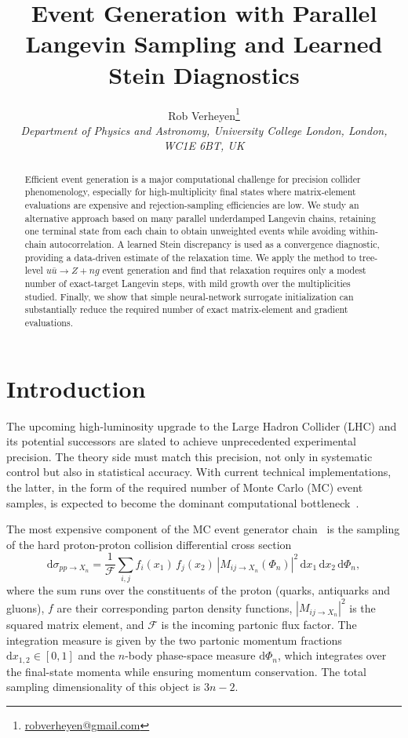 \documentclass[11pt]{article}
\title{Event Generation with Parallel Langevin Sampling and Learned Stein Diagnostics}
\author{
  \parbox{0.96\textwidth}{\centering
    Rob Verheyen\footnote{\href{mailto:robverheyen@gmail.com}{robverheyen@gmail.com}}\\
    {\small\textit{Department of Physics and Astronomy, University College London, London, WC1E 6BT, UK}}
  }
}
\date{}
\newcommand{\dd}{\mathrm{d}}
\begin{document}
\maketitle

\begin{abstract}
Efficient event generation is a major computational challenge for precision collider phenomenology, especially for high-multiplicity final states where matrix-element evaluations are expensive and rejection-sampling efficiencies are low.
We study an alternative approach based on many parallel underdamped Langevin chains, retaining one terminal state from each chain to obtain unweighted events while avoiding within-chain autocorrelation.
A learned Stein discrepancy is used as a convergence diagnostic, providing a data-driven estimate of the relaxation time.
We apply the method to tree-level $u\bar u\to Z+n g$ event generation and find that relaxation requires only a modest number of exact-target Langevin steps, with mild growth over the multiplicities studied.
Finally, we show that simple neural-network surrogate initialization can substantially reduce the required number of exact matrix-element and gradient evaluations.
\end{abstract}


\section{Introduction}
The upcoming high-luminosity upgrade to the Large Hadron Collider (LHC) \cite{ZurbanoFernandez:2020cco} and its potential successors \cite{FCC:2018evy,FCC:2018vvp} are slated to achieve unprecedented experimental precision.
The theory side must match this precision, not only in systematic control but also in statistical accuracy. 
With current technical implementations, the latter, in the form of the required number of Monte Carlo (MC) event samples, is expected to become the dominant computational bottleneck~\cite{Buckley:2011ms,Narain:2022qud,HEPSoftwareFoundation:2017ggl,HSFPhysicsEventGeneratorWG:2020gxw,EuropeanStrategyGroup:2020pow}.

The most expensive component of the MC event generator chain~\cite{vanBeekveld:2026uxl} is the sampling of the hard proton-proton collision differential cross section
\begin{equation} \label{cross-section}
  \dd \sigma_{p p \rightarrow X_n} = \frac{1}{\mathcal{F}} \sum_{i,j} f_i(x_1) \, f_j(x_2) \, |M_{ij \rightarrow X_n}(\Phi_n)|^2 \, \dd x_1 \, \dd x_2 \, \dd\Phi_n,
\end{equation}
where the sum runs over the constituents of the proton (quarks, antiquarks and gluons), $f$ are their corresponding parton density functions, $|M_{ij\rightarrow X_n}|^2$ is the squared matrix element, and $\mathcal{F}$ is the incoming partonic flux factor.
The integration measure is given by the two partonic momentum fractions $\dd x_{1,2} \in [0,1]$ and the $n$-body phase-space measure $\dd\Phi_n$, which integrates over the final-state momenta while ensuring momentum conservation.
The total sampling dimensionality of this object is $3n-2$. 
\end{document}
